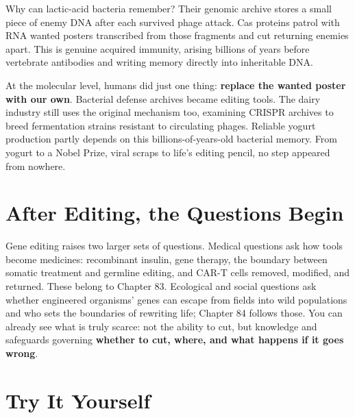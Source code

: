 Why can lactic-acid bacteria remember? Their genomic archive stores a small piece of enemy DNA after each survived phage attack. Cas proteins patrol with RNA wanted posters transcribed from those fragments and cut returning enemies apart. This is genuine acquired immunity, arising billions of years before vertebrate antibodies and writing memory directly into inheritable DNA.

At the molecular level, humans did just one thing: \textbf{replace the wanted poster with our own}. Bacterial defense archives became editing tools. The dairy industry still uses the original mechanism too, examining CRISPR archives to breed fermentation strains resistant to circulating phages. Reliable yogurt production partly depends on this billions-of-years-old bacterial memory. From yogurt to a Nobel Prize, viral scraps to life's editing pencil, no step appeared from nowhere.

\section{After Editing, the Questions Begin}

Gene editing raises two larger sets of questions. Medical questions ask how tools become medicines: recombinant insulin, gene therapy, the boundary between somatic treatment and germline editing, and CAR-T cells removed, modified, and returned. These belong to Chapter 83. Ecological and social questions ask whether engineered organisms' genes can escape from fields into wild populations and who sets the boundaries of rewriting life; Chapter 84 follows those. You can already see what is truly scarce: not the ability to cut, but knowledge and safeguards governing \textbf{whether to cut, where, and what happens if it goes wrong}.

\section*{Try It Yourself}

